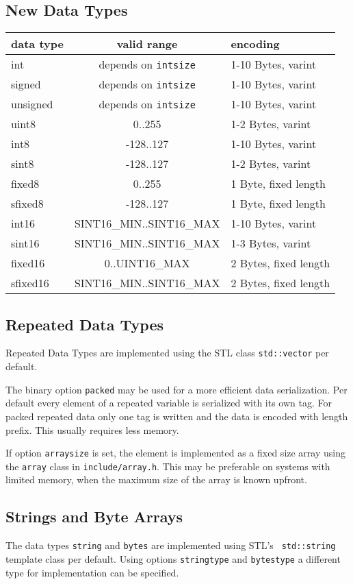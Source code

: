 \documentclass[12pt]{article}
\begin{document}
\subsection{New Data Types}
\begin{center}
\begin{tabular}{|l|c|l|}
\hline
	data type & valid range & encoding\\
\hline
	int	& depends on {\tt intsize}	& 1-10 Bytes, varint\\
	signed	& depends on {\tt intsize}	& 1-10 Bytes, varint\\
	unsigned& depends on {\tt intsize}	& 1-10 Bytes, varint\\
	uint8	& 0..255			& 1-2 Bytes, varint\\
	int8	& -128..127			& 1-10 Bytes, varint\\
	sint8	& -128..127			& 1-2 Bytes, varint\\
	fixed8	& 0..255			& 1 Byte, fixed length\\
	sfixed8	& -128..127			& 1 Byte, fixed length\\
	int16	& SINT16\_MIN..SINT16\_MAX	& 1-10 Bytes, varint\\
	sint16	& SINT16\_MIN..SINT16\_MAX	& 1-3 Bytes, varint\\
	fixed16	& 0..UINT16\_MAX		& 2 Bytes, fixed length\\
	sfixed16& SINT16\_MIN..SINT16\_MAX	& 2 Bytes, fixed length\\
\hline
\end{tabular}
\end{center}


\subsection{Repeated Data Types}
Repeated Data Types are implemented using the STL class {\tt std::vector} per
default.

The binary option {\tt packed} may be used for a more efficient data
serialization. Per default every element of a repeated variable is serialized
with its own tag. For packed repeated data only one tag is written and the data
is encoded with length prefix. This usually requires less memory.

If option {\tt arraysize} is set, the element is implemented as a
fixed size array using the {\tt array} class in {\tt include/array.h}. This may
be preferable on systems with limited memory, when the maximum size of the
array is known upfront.

\subsection{Strings and Byte Arrays}
The data types {\tt string} and {\tt bytes} are implemented using STL's {\tt
std::string} template class per default. Using options {\tt stringtype} and
{\tt bytestype} a different type for implementation can be specified.
\end{document}
